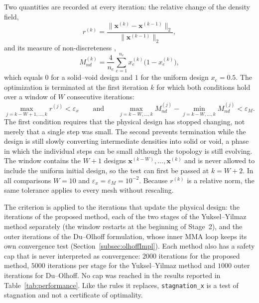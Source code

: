 \documentclass[applsci,article,submit,pdftex,moreauthors]{Definitions/mdpi}
\begin{document}
Two quantities are recorded at every iteration: the relative change of the density field,
\begin{equation}
r^{(k)} = \frac{\lVert \mathbf{x}^{(k)} - \mathbf{x}^{(k-1)} \rVert_2}{\lVert \mathbf{x}^{(k-1)} \rVert_2},
\end{equation}
and its measure of non-discreteness \citep{Sigmund2007},
\begin{equation}
M_{nd}^{(k)} = \frac{4}{n_e}\sum_{e=1}^{n_e} x_e^{(k)}\bigl(1 - x_e^{(k)}\bigr),
\end{equation}
which equals $0$ for a solid--void design and $1$ for the uniform design $x_e = 0.5$. The optimization is terminated at the first iteration $k$ for which both conditions hold over a window of $W$ consecutive iterations:
\begin{equation}
\max_{j = k-W+1,\ldots,k} r^{(j)} < \varepsilon_x
\qquad\text{and}\qquad
\max_{j = k-W,\ldots,k} M_{nd}^{(j)} - \min_{j = k-W,\ldots,k} M_{nd}^{(j)} < \varepsilon_M .
\label{eqn:stagnationX}
\end{equation}
The first condition requires that the physical design has stopped changing, not merely that a single step was small. The second prevents termination while the design is still slowly converting intermediate densities into solid or void, a phase in which the individual steps can be small although the topology is still evolving. The window contains the $W+1$ designs $\mathbf{x}^{(k-W)},\ldots,\mathbf{x}^{(k)}$ and is never allowed to include the uniform initial design, so the test can first be passed at $k = W+2$. In all comparisons $W = 10$ and $\varepsilon_x = \varepsilon_M = 10^{-2}$. Because $r^{(k)}$ is a relative norm, the same tolerance applies to every mesh without rescaling.

The criterion is applied to the iterations that update the physical design: the iterations of the proposed method, each of the two stages of the Yuksel--Yilmaz method separately (the window restarts at the beginning of Stage~2), and the outer iterations of the Du--Olhoff formulation, whose inner MMA loop keeps its own convergence test (Section~\ref{subsec:olhoffImpl}). Each method also has a safety cap that is never interpreted as convergence: $2000$ iterations for the proposed method, $5000$ iterations per stage for the Yuksel--Yilmaz method and $1000$ outer iterations for Du--Olhoff. No cap was reached in the results reported in Table~\ref{tab:performance}. Like the rules it replaces, \texttt{stagnation\_x} is a test of stagnation and not a certificate of optimality.
\end{document}
